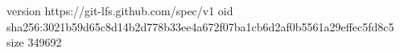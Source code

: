 version https://git-lfs.github.com/spec/v1
oid sha256:3021b59d65c8d14b2d778b33ee4a672f07ba1cb6d2af0b5561a29effec5fd8c5
size 349692

